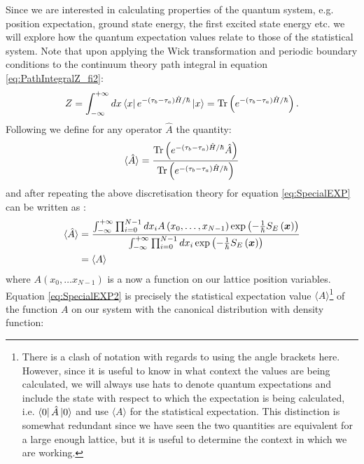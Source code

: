 \documentclass[12pt]{article}
\begin{document}
        Since we are interested in calculating properties of the quantum system, e.g. position expectation, ground state energy, the first excited state energy etc. we will explore how the quantum expectation values relate to those of the statistical system. Note that upon applying the Wick transformation and periodic boundary conditions to the continuum theory path integral in equation \ref{eq:PathIntegralZ_fi2}:
        \begin{equation}
            Z = \int_{-\infty}^{+\infty} dx \bra{x}e^{-\left(\tau_b-\tau_a\right)\hat{H}/\hbar}\ket{x} = \text{Tr}\left(e^{-\left(\tau_b-\tau_a\right)\hat{H}/\hbar}\right).
        \end{equation}
        Following \cite{creutz_freedman_1981} we define for any operator $\hat{A}$ the quantity:
        \begin{equation}
            \label{eq:SpecialEXP}
            \braket{\hat{A}} = \frac{\text{Tr}\left(e^{-\left(\tau_b-\tau_a\right)\hat{H}/\hbar}\hat{A}\right)}{\text{Tr}\left(e^{-\left(\tau_b-\tau_a\right)\hat{H}/\hbar}\right)}
        \end{equation}
        and after repeating the above discretisation theory for equation \ref{eq:SpecialEXP} can be written as \cite{creutz_freedman_1981}:
        \begin{align}
            \label{eq:SpecialEXP2}
            \braket{\hat{A}} & = \frac{\int^{+\infty}_{-\infty}\prod_{i=0}^{N-1}dx_i A\left(x_0,\dots,x_{N-1}\right)\exp{\left(-\frac{1}{\hbar}S_{E}\left(\bm{x}\right)\right)}}{\int^{+\infty}_{-\infty}\prod_{i=0}^{N-1}dx_i \exp{\left(-\frac{1}{\hbar}S_{E}\left(\bm{x}\right)\right)}}\\
            & = \langle A \rangle
        \end{align}
        where $A\left(x_0,\dots x_{N-1}\right)$ is a now a function on our lattice position variables. Equation \ref{eq:SpecialEXP2} is precisely the statistical expectation value $\langle A \rangle$\footnote{There is a clash of notation with regards to using the angle brackets here. However, since it is useful to know in what context the values are being calculated, we will always use hats to denote quantum expectations and include the state with respect to which the expectation is being calculated, i.e. $\bra{0}\hat{A}\ket{0}$ and use $\langle A \rangle$ for the statistical expectation. This distinction is somewhat redundant since we have seen the two quantities are equivalent for a large enough lattice, but it is useful to determine the context in which we are working.} of the function $A$ on our system with the canonical distribution with density function:
\end{document}
